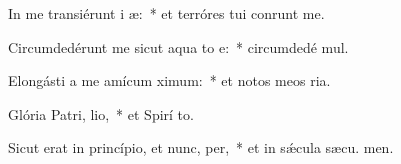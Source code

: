 \item In me transiérunt i æ:~* et terróres tui conrunt me.
\item Circumdedérunt me sicut aqua to e:~* circumdedé  mul.
\item Elongásti a me amícum  ximum:~* et notos meos  ria.
\item Glória Patri,  lio,~* et Spirí to.
\item Sicut erat in princípio, et nunc,  per,~* et in sǽcula sæcu. men.
